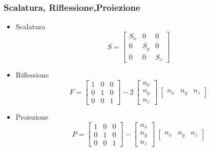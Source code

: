 \begin{frame}
\frametitle{Scalatura, Riflessione,Proiezione}
\begin{itemize}
\item Scalatura
\begin{equation}
S = \begin{bmatrix}
    S_x & 0 & 0\\
    0 & S_y & 0\\
    0 & 0 & S_z
    \end{bmatrix}
\end{equation}
\item Riflessione
\begin{equation}
F = \begin{bmatrix}
      1 & 0 & 0\\
      0 & 1 & 0\\
      0 & 0 & 1
    \end{bmatrix}
    -2~\begin{bmatrix}
    n_x \\
    n_y \\
    n_z
    \end{bmatrix} 
    ~\begin{bmatrix}
    n_x & n_y & n_z
    \end{bmatrix}
\end{equation}
\item Proiezione
\begin{equation}
 P = \begin{bmatrix}
      1 & 0 & 0\\
      0 & 1 & 0\\
      0 & 0 & 1
    \end{bmatrix}
    -\begin{bmatrix}
    n_x \\
    n_y \\
    n_z
    \end{bmatrix} 
    ~\begin{bmatrix}
    n_x & n_y & n_z
    \end{bmatrix}
\end{equation}
\end{itemize}
\end{frame}
%

